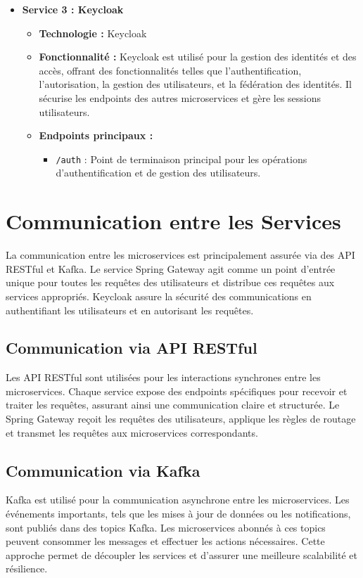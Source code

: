 \documentclass[a4paper, 11pt, openany]{report}
\begin{document}
\begin{itemize}
    \item \textbf{Service 3 : Keycloak}
    \begin{itemize}
        \item \textbf{Technologie :} Keycloak
        \item \textbf{Fonctionnalité :} Keycloak est utilisé pour la gestion des identités et des accès, offrant des fonctionnalités telles que l'authentification, l'autorisation, la gestion des utilisateurs, et la fédération des identités. Il sécurise les endpoints des autres microservices et gère les sessions utilisateurs.
        \item \textbf{Endpoints principaux :}
        \begin{itemize}
            \item \texttt{/auth} : Point de terminaison principal pour les opérations d'authentification et de gestion des utilisateurs.
        \end{itemize}
    \end{itemize}
\end{itemize}







\section{Communication entre les Services}
La communication entre les microservices est principalement assurée via des API RESTful et Kafka. Le service Spring Gateway agit comme un point d'entrée unique pour toutes les requêtes des utilisateurs et distribue ces requêtes aux services appropriés. Keycloak assure la sécurité des communications en authentifiant les utilisateurs et en autorisant les requêtes.

\subsection{Communication via API RESTful}
Les API RESTful sont utilisées pour les interactions synchrones entre les microservices. Chaque service expose des endpoints spécifiques pour recevoir et traiter les requêtes, assurant ainsi une communication claire et structurée. Le Spring Gateway reçoit les requêtes des utilisateurs, applique les règles de routage et transmet les requêtes aux microservices correspondants.

\subsection{Communication via Kafka}
Kafka est utilisé pour la communication asynchrone entre les microservices. Les événements importants, tels que les mises à jour de données ou les notifications, sont publiés dans des topics Kafka. Les microservices abonnés à ces topics peuvent consommer les messages et effectuer les actions nécessaires. Cette approche permet de découpler les services et d'assurer une meilleure scalabilité et résilience.
\end{document}

